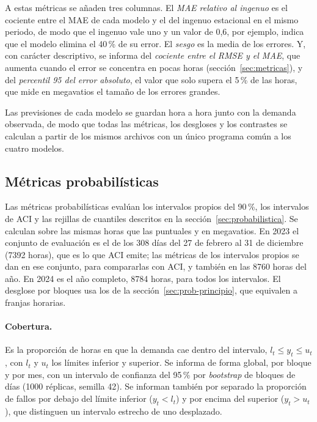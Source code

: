 A estas métricas se añaden tres columnas. El \emph{MAE relativo al ingenuo}
es el cociente entre el MAE de cada modelo y el del ingenuo estacional en el
mismo periodo, de modo que el ingenuo vale uno y un valor de 0,6, por ejemplo,
indica que el modelo elimina el 40\,\% de su error. El \emph{sesgo} es la
media de los errores. Y, con carácter descriptivo, se informa del
\emph{cociente entre el RMSE y el MAE}, que aumenta cuando el error se
concentra en pocas horas (sección~\ref{sec:metricas}), y del \emph{percentil
95 del error absoluto}, el valor que solo supera el 5\,\% de las horas, que
mide en megavatios el tamaño de los errores grandes.

Las previsiones de cada modelo se guardan hora a hora junto con la demanda
observada, de modo que todas las métricas, los desgloses y los contrastes se
calculan a partir de los mismos archivos con un único programa común a los
cuatro modelos.

\subsection{Métricas probabilísticas}\label{sec:prob-metricas}

Las métricas probabilísticas evalúan los intervalos propios del 90\,\%, los
intervalos de ACI y las rejillas de cuantiles descritos en la
sección~\ref{sec:probabilistica}. Se calculan sobre las mismas horas que las
puntuales y en megavatios. En 2023 el conjunto de evaluación es el de los 308
días del 27 de febrero al 31 de diciembre (7392 horas), que es lo que ACI
emite; las métricas de los intervalos propios se dan en ese conjunto, para
compararlas con ACI, y también en las 8760 horas del año. En 2024 es el año
completo, 8784 horas, para todos los intervalos. El desglose por bloques
usa los de la sección~\ref{sec:prob-principio}, que equivalen a franjas
horarias.

\paragraph{Cobertura.} Es la proporción de horas en que la demanda cae dentro
del intervalo, $l_t \le y_t \le u_t$, con $l_t$ y $u_t$ los límites inferior y
superior. Se informa de forma global, por bloque y por mes, con un intervalo de
confianza del 95\,\% por \textit{bootstrap} de bloques de días (1000
réplicas, semilla 42). Se informan también por separado la proporción de fallos
por debajo del límite inferior ($y_t < l_t$) y por encima del superior
($y_t > u_t$), que distinguen un intervalo estrecho de uno desplazado.


